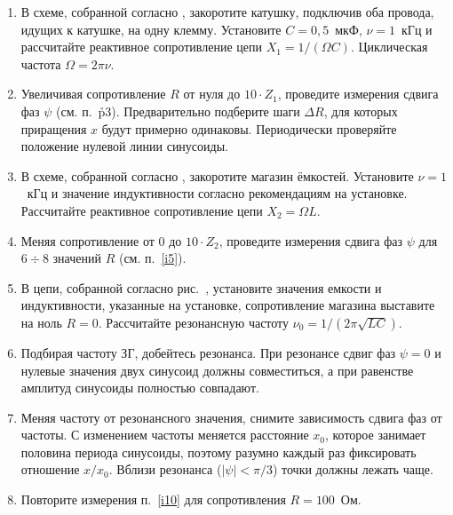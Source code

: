 \begin{lab:task}
\begin{enumerate}
	\item В схеме, собранной согласно , закоротите катушку, подключив оба провода, идущих к катушке, на одну клемму.
	Установите $C=0,5$~мкФ, $\nu=1$~кГц и рассчитайте реактивное сопротивление цепи $X_1=1/(\Omega C)$. Циклическая частота
	$\Omega=2\pi\nu$.
	
	\item \label{i5} Увеличивая сопротивление $R$ от нуля до $10\cdot Z_1$, проведите измерения сдвига фаз $\psi$ (см. п.~\r{p3}).
	Предварительно подберите шаги $\Delta R$, для которых приращения $x$ будут примерно одинаковы. Периодически проверяйте
	положение нулевой линии синусоиды.
	
	
	\item В схеме, собранной согласно , закоротите магазин ёмкостей. Установите  $\nu=1$~кГц и значение индуктивности согласно рекомендациям на установке. Рассчитайте реактивное сопротивление цепи $X_2=\Omega L$.
	
	\item Меняя сопротивление от 0 до $10\cdot Z_2$, проведите измерения сдвига фаз $\psi$ для $6\div8$ значений $R$ (см.
	п.~\ref{i5}).
	
	
	\item В цепи, собранной согласно рис.~, установите значения емкости и индуктивности, указанные на установке, сопротивление магазина выставите на ноль
	$R=0$. Рассчитайте резонансную частоту $\nu_0=1/(2\pi\sqrt{LC})$.
	
	\item Подбирая частоту ЗГ, добейтесь резонанса. При резонансе сдвиг фаз $\psi=0$ и нулевые значения двух синусоид должны
	совместиться, а при равенстве амплитуд синусоиды полностью совпадают.
	
	\item \label{i10} Меняя частоту  от резонансного значения, снимите зависимость сдвига фаз от частоты. С
	изменением частоты меняется расстояние $x_0$, которое занимает половина периода синусоиды, поэтому разумно каждый раз
	фиксировать отношение $x/x_0$. Вблизи резонанса ($|\psi|<\pi/3$) точки должны лежать чаще.
	
	\item Повторите измерения п.~\ref{i10} для сопротивления $R=100$~Ом.
	

\end{enumerate}
\end{lab:task}
